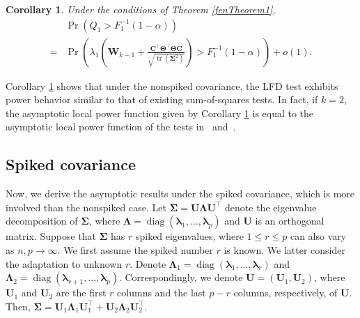 \documentclass[12pt]{article} %
\DeclareMathOperator{\mytr}{tr}
\DeclareMathOperator{\mydiag}{diag}
\newcommand{\bC}{\mathbf{C}}
\newcommand{\bU}{\mathbf{U}}
\newcommand{\bW}{\mathbf{W}}
\newcommand{\bfsym}[1]{\ensuremath{\boldsymbol{#1}}}
\def\blambda {\bfsym {\lambda}}
\def\bLambda {\bfsym {\Lambda}}
\def\bSigma {\bfsym {\Sigma}}
\def\bTheta {\bfsym {\Theta}}
\newtheorem{corollary}{Corollary}
\theoremstyle{definition}
\begin{document}
\begin{corollary}\label{kuCor1}
    Under the conditions of Theorem \ref{fenTheorem1}, 
    \begin{equation*}
        \begin{split}
        &\Pr\left(
            Q_1>F_1^{-1}(1-\alpha)
        \right) 
        \\
        =&
        \Pr\left(
        \lambda_1\left(\bW_{k-1}+\frac{\bC^\top \bTheta^\top \bTheta \bC}{\sqrt{\mytr(\bSigma^2)} }\right)
        >F_1^{-1}(1-\alpha)
    \right)+o(1).
        \end{split}
    \end{equation*}
\end{corollary}
Corollary \ref{kuCor1} shows that under the nonspiked covariance, the LFD test exhibits power behavior similar to that of existing sum-of-squares tests.
In fact, if $k=2$, the asymptotic local power function given by Corollary \ref{kuCor1} is equal to the asymptotic local power function of the tests in~\citet{Bai1996Efiect} and~\citet{Chen2010A}.




\subsection{Spiked covariance}


Now, we derive the asymptotic results under the spiked covariance, which is more involved than the nonspiked case.
Let $\bSigma= \bU\bLambda \bU^\top$ denote the eigenvalue decomposition of $\bSigma$, where $\bLambda =\mydiag (\blambda_1,\ldots,\blambda_p)$ and $\bU$ is an orthogonal matrix.
Suppose that $\bSigma$ has $r$ spiked eigenvalues, where $1\leq r\leq p$ can also vary as $n,p\to \infty$.
    We first assume the spiked number $r$ is known.
    We latter consider the adaptation to unknown $r$.
Denote $\bLambda_1=\mydiag(\blambda_1,\ldots,\blambda_r)$ and $\bLambda_2=\mydiag(\blambda_{r+1},\ldots,\blambda_p)$.
Correspondingly, we denote $\bU=(\bU_1,\bU_2)$, where $\bU_1$ and $\bU_2$ are the first $r$ columns and the last $p-r$ columns, respectively, of $\bU$.
Then, $\bSigma=\bU_1\bLambda_1 \bU_1^\top+\bU_2\bLambda_2 \bU_2^\top$.
\end{document}
